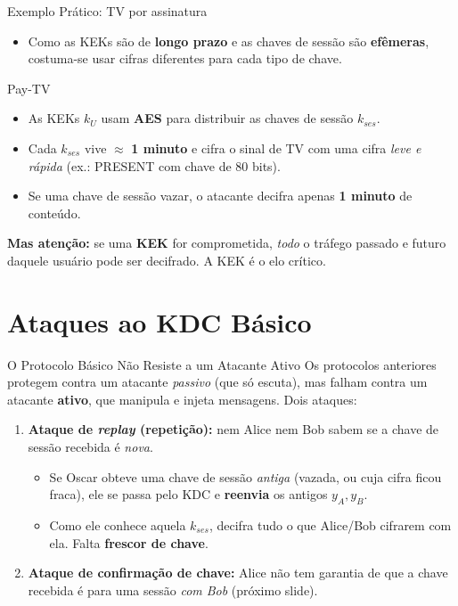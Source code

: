 \documentclass{beamer}
\begin{document}
\begin{frame}{Exemplo Prático: TV por assinatura}
    \begin{itemize}
        \item Como as KEKs são de \textbf{longo prazo} e as chaves de sessão são \textbf{efêmeras}, costuma-se usar cifras diferentes para cada tipo de chave.
    \end{itemize}
    \medskip
    \begin{exampleblock}{Pay-TV}
        \footnotesize
        \begin{itemize}
            \item As KEKs $k_U$ usam \textbf{AES} para distribuir as chaves de sessão $k_{ses}$.
            \item Cada $k_{ses}$ vive $\approx$ \textbf{1 minuto} e cifra o sinal de TV com uma cifra \emph{leve e rápida} (ex.: PRESENT com chave de 80 bits).
            \item Se uma chave de sessão vazar, o atacante decifra apenas \textbf{1 minuto} de conteúdo.
        \end{itemize}
    \end{exampleblock}
    \medskip
    \begin{tcolorbox}[colback=red!5,colframe=red!60!black,boxrule=0.5pt]
        \footnotesize
        \textbf{Mas atenção:} se uma \textbf{KEK} for comprometida, \emph{todo} o tráfego passado e futuro daquele usuário pode ser decifrado. A KEK é o elo crítico.
    \end{tcolorbox}
\end{frame}

\section{Ataques ao KDC Básico}

\begin{frame}{O Protocolo Básico Não Resiste a um Atacante Ativo}
    Os protocolos anteriores protegem contra um atacante \emph{passivo} (que só escuta), mas \alert{falham} contra um atacante \textbf{ativo}, que manipula e injeta mensagens. Dois ataques:
    \medskip
    \begin{enumerate}
        \item \textbf{Ataque de \textit{replay} (repetição):} nem Alice nem Bob sabem se a chave de sessão recebida é \emph{nova}.
        \begin{itemize}
            \footnotesize
            \item Se Oscar obteve uma chave de sessão \emph{antiga} (vazada, ou cuja cifra ficou fraca), ele se passa pelo KDC e \textbf{reenvia} os antigos $y_A, y_B$.
            \item Como ele conhece aquela $k_{ses}$, decifra tudo o que Alice/Bob cifrarem com ela. Falta \textbf{frescor de chave}.
        \end{itemize}
        \medskip
        \item \textbf{Ataque de confirmação de chave:} Alice não tem garantia de que a chave recebida é para uma sessão \emph{com Bob} (próximo slide).
    \end{enumerate}
\end{frame}
\end{document}
